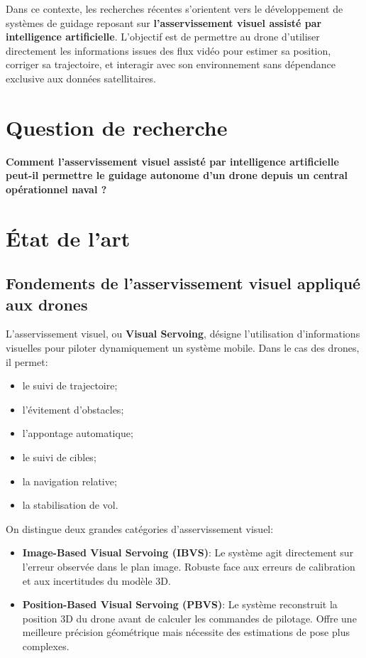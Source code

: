 \documentclass[12pt, a4paper, twoside, openright]{report}
\begin{document}
Dans ce contexte, les recherches récentes s’orientent vers le développement de systèmes de guidage reposant sur \textbf{l’asservissement visuel assisté par intelligence artificielle}. L’objectif est de permettre au drone d’utiliser directement les informations issues des flux vidéo pour estimer sa position, corriger sa trajectoire, et interagir avec son environnement sans dépendance exclusive aux données satellitaires.

\section{Question de recherche}
\begin{framed}
    \textbf{Comment l’asservissement visuel assisté par intelligence artificielle peut-il permettre le guidage autonome d’un drone depuis un central opérationnel naval ?}
\end{framed}

\section{État de l’art}

\subsection{Fondements de l’asservissement visuel appliqué aux drones}
L’asservissement visuel, ou \textbf{Visual Servoing}, désigne l’utilisation d’informations visuelles pour piloter dynamiquement un système mobile. Dans le cas des drones, il permet:
\begin{itemize}
    \item le suivi de trajectoire;
    \item l’évitement d’obstacles;
    \item l’appontage automatique;
    \item le suivi de cibles;
    \item la navigation relative;
    \item la stabilisation de vol.
\end{itemize}

On distingue deux grandes catégories d’asservissement visuel:
\begin{itemize}
    \item \textbf{Image-Based Visual Servoing (IBVS)}: Le système agit directement sur l’erreur observée dans le plan image. Robuste face aux erreurs de calibration et aux incertitudes du modèle 3D.
    \item \textbf{Position-Based Visual Servoing (PBVS)}: Le système reconstruit la position 3D du drone avant de calculer les commandes de pilotage. Offre une meilleure précision géométrique mais nécessite des estimations de pose plus complexes.
\end{itemize}
\end{document}
